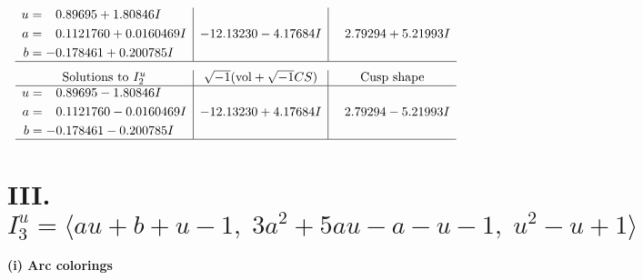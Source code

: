\documentclass[1p]{elsarticle_modified}
\theoremstyle{definition}
\newcommand{\I}{\sqrt{-1}}
\begin{document}
$$\begin{array}{c|c|c}
\begin{aligned}
u &= \phantom{-}0.89695 + 1.80846 I \\
a &= \phantom{-}0.1121760 + 0.0160469 I \\
b &= -0.178461 + 0.200785 I\end{aligned}
 & -12.13230 - 4.17684 I & \phantom{-}2.79294 + 5.21993 I\\
 \hline 
 \end{array}$$\newpage$$\begin{array}{c|c|c}  
\text{Solutions to }I^u_{2}& \I (\text{vol} + \sqrt{-1}CS) & \text{Cusp shape}\\
 \hline 
\begin{aligned}
u &= \phantom{-}0.89695 - 1.80846 I \\
a &= \phantom{-}0.1121760 - 0.0160469 I \\
b &= -0.178461 - 0.200785 I\end{aligned}
 & -12.13230 + 4.17684 I & \phantom{-}2.79294 - 5.21993 I\\
 \hline 
 \end{array}$$\newpage\newpage\renewcommand{\arraystretch}{1}
\centering \section*{III. $I^u_{3}= \langle a u+b+u-1,\;3 a^2+5 a u- a- u-1,\;u^2- u+1 \rangle$}
\flushleft \textbf{(i) Arc colorings}\\
\end{document}
